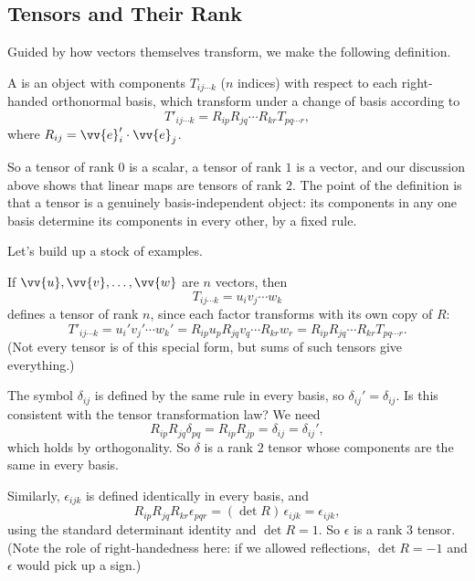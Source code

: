 \subsection{Tensors and Their Rank}

Guided by how vectors themselves transform, we make the following definition.

\begin{definition}
	A  is an object with components $T_{ij \cdots k}$ ($n$ indices) with respect to each right-handed orthonormal basis, which transform under a change of basis according to
	$$
	T'_{ij\cdots k} = R_{ip} R_{jq} \cdots R_{kr} T_{pq \cdots r},
	$$
	where $R_{ij} = \vv{e}_i' \cdot \vv{e}_j$.
\end{definition}

So a tensor of rank $0$ is a scalar, a tensor of rank $1$ is a vector, and our discussion above shows that linear maps are tensors of rank $2$. The point of the definition is that a tensor is a genuinely basis-independent object: its components in any one basis determine its components in every other, by a fixed rule.

Let's build up a stock of examples.

\begin{example}
	If $\vv{u}, \vv{v}, \dots, \vv{w}$ are $n$ vectors, then
	$$
	T_{ij \cdots k} = u_i v_j \cdots w_k
	$$
	defines a tensor of rank $n$, since each factor transforms with its own copy of $R$:
	$$
	T'_{ij\cdots k} = u_i' v_j' \cdots w_k' = R_{ip}u_p R_{jq} v_q \cdots R_{kr} w_r = R_{ip}R_{jq}\cdots R_{kr} T_{pq\cdots r}.
	$$
	(Not every tensor is of this special form, but sums of such tensors give everything.)
\end{example}

\begin{example}
	The symbol $\delta_{ij}$ is defined by the same rule in every basis, so $\delta_{ij}' = \delta_{ij}$. Is this consistent with the tensor transformation law? We need
	$$
	R_{ip}R_{jq} \delta_{pq} = R_{ip}R_{jp} = \delta_{ij} = \delta_{ij}',
	$$
	which holds by orthogonality. So $\delta$ is a rank $2$ tensor whose components are the same in every basis.
\end{example}

\begin{example}
	Similarly, $\epsilon_{ijk}$ is defined identically in every basis, and
	$$
	R_{ip}R_{jq}R_{kr} \epsilon_{pqr} = (\det R) \, \epsilon_{ijk} = \epsilon_{ijk},
	$$
	using the standard determinant identity and $\det R = 1$. So $\epsilon$ is a rank $3$ tensor. (Note the role of right-handedness here: if we allowed reflections, $\det R = -1$ and $\epsilon$ would pick up a sign.)
\end{example}

